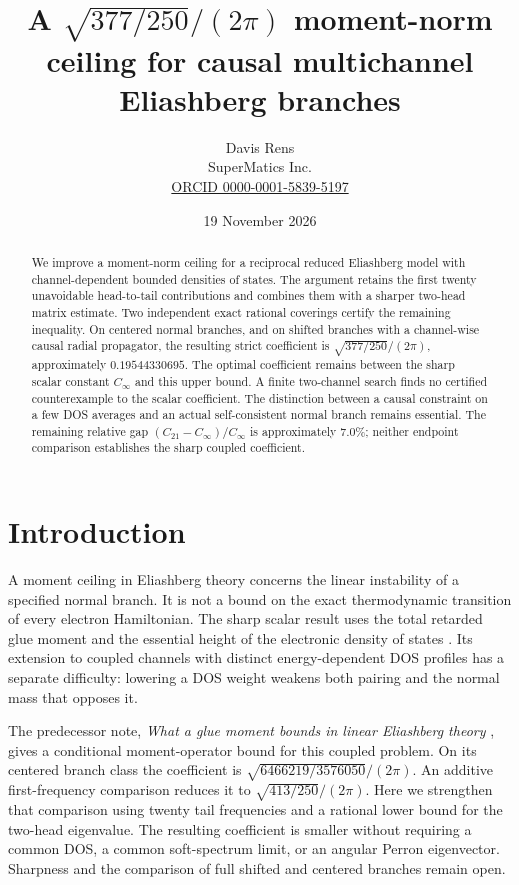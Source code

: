 \documentclass[11pt]{article}
\title{A $\sqrt{377/250}/(2\pi)$ moment-norm ceiling for causal multichannel Eliashberg branches}
\author{Davis Rens\\SuperMatics Inc.\\\href{https://orcid.org/0000-0001-5839-5197}{ORCID 0000-0001-5839-5197}}
\date{19 November 2026}
\begin{document}
\maketitle
\begin{abstract}
We improve a moment-norm ceiling for a reciprocal reduced Eliashberg model with channel-dependent bounded densities of states. The argument retains the first twenty unavoidable head-to-tail contributions and combines them with a sharper two-head matrix estimate. Two independent exact rational coverings certify the remaining inequality. On centered normal branches, and on shifted branches with a channel-wise causal radial propagator, the resulting strict coefficient is $\sqrt{377/250}/(2\pi)$, approximately $0.19544330695$. The optimal coefficient remains between the sharp scalar constant $C_\infty$ and this upper bound. A finite two-channel search finds no certified counterexample to the scalar coefficient. The distinction between a causal constraint on a few DOS averages and an actual self-consistent normal branch remains essential.
The remaining relative gap $(C_{21}-C_\infty)/C_\infty$ is approximately $7.0\%$; neither endpoint comparison establishes the sharp coupled coefficient.
\end{abstract}

\section{Introduction}
A moment ceiling in Eliashberg theory concerns the linear instability of a specified normal branch. It is not a bound on the exact thermodynamic transition of every electron Hamiltonian. The sharp scalar result uses the total retarded glue moment and the essential height of the electronic density of states \cite{finite,gsi}. Its extension to coupled channels with distinct energy-dependent DOS profiles has a separate difficulty: lowering a DOS weight weakens both pairing and the normal mass that opposes it.

The predecessor note, \emph{What a glue moment bounds in linear Eliashberg theory} \cite{predecessor}, gives a conditional moment-operator bound for this coupled problem. On its centered branch class the coefficient is $\sqrt{6466219/3576050}/(2\pi)$. An additive first-frequency comparison reduces it to $\sqrt{413/250}/(2\pi)$. Here we strengthen that comparison using twenty tail frequencies and a rational lower bound for the two-head eigenvalue. The resulting coefficient is smaller without requiring a common DOS, a common soft-spectrum limit, or an angular Perron eigenvector. Sharpness and the comparison of full shifted and centered branches remain open.
\end{document}

